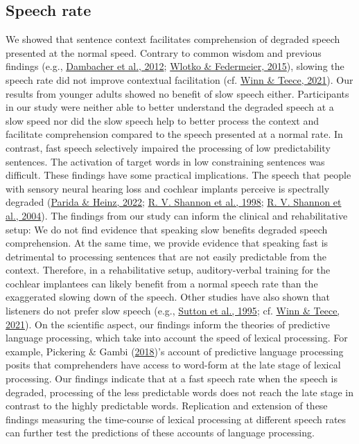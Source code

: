 \documentclass[a4paper, nobind]{templates/ociamthesis}
\begin{document}
\hypertarget{speech-rate}{%
\subsection{Speech rate}\label{speech-rate}}

We showed that sentence context facilitates comprehension of degraded speech presented at the normal speed.
Contrary to common wisdom and previous findings (e.g., \protect\hyperlink{ref-Dambacher2012}{Dambacher et al., 2012}; \protect\hyperlink{ref-Wlotko2015}{Wlotko \& Federmeier, 2015}), slowing the speech rate did not improve contextual facilitation (cf. \protect\hyperlink{ref-Winn2021}{Winn \& Teece, 2021}).
Our results from younger adults showed no benefit of slow speech either.
Participants in our study were neither able to better understand the degraded speech at a slow speed
nor did the slow speech help to better process the context and facilitate comprehension compared to the speech presented at a normal rate.
In contrast, fast speech selectively impaired the processing of low predictability sentences.
The activation of target words in low constraining sentences was difficult.
These findings have some practical implications.
The speech that people with sensory neural hearing loss and cochlear implants perceive is spectrally degraded (\protect\hyperlink{ref-Parida2022}{Parida \& Heinz, 2022}; \protect\hyperlink{ref-Shannon1998}{R. V. Shannon et al., 1998}; \protect\hyperlink{ref-Shannon2004}{R. V. Shannon et al., 2004}).
The findings from our study can inform the clinical and rehabilitative setup:
We do not find evidence that speaking slow benefits degraded speech comprehension.
At the same time, we provide evidence that speaking fast is detrimental to processing sentences that are not easily predictable from the context.
Therefore, in a rehabilitative setup, auditory-verbal training for the cochlear implantees can likely benefit from a normal speech rate than the exaggerated slowing down of the speech.
Other studies have also shown that listeners do not prefer slow speech (e.g., \protect\hyperlink{ref-Sutton1995}{Sutton et al., 1995}; cf. \protect\hyperlink{ref-Winn2021}{Winn \& Teece, 2021}).
On the scientific aspect,
our findings inform the theories of predictive language processing, which take into account the speed of lexical processing.
For example, Pickering \& Gambi (\protect\hyperlink{ref-Pickering2018}{2018})'s account of predictive language processing posits that comprehenders have access to word-form at the late stage of lexical processing.
Our findings indicate that at a fast speech rate when the speech is degraded, processing of the less predictable words does not reach the late stage in contrast to the highly predictable words.
Replication and extension of these findings measuring the time-course of lexical processing at different speech rates can further test the predictions of these accounts of language processing.
\end{document}
